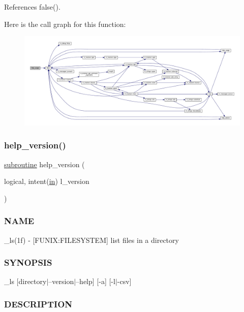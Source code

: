 References false().

Here is the call graph for this function\+:
\nopagebreak
\begin{figure}[H]
\begin{center}
\leavevmode
\includegraphics[width=350pt]{__ls_8f90_a3e09a3b52ee8fb04eeb93fe5761626a8_cgraph}
\end{center}
\end{figure}
\mbox{\label{__ls_8f90_a39c21619b08a3c22f19e2306efd7f766}} 
\subsubsection{\texorpdfstring{help\+\_\+version()}{help\_version()}}
{\footnotesize\ttfamily \hyperlink{M__stopwatch_83_8txt_acfbcff50169d691ff02d4a123ed70482}{subroutine} help\+\_\+version (\begin{DoxyParamCaption}\item[{logical, intent(\hyperlink{M__journal_83_8txt_afce72651d1eed785a2132bee863b2f38}{in})}]{l\+\_\+version }\end{DoxyParamCaption})}



\subsubsection*{N\+A\+ME}

\+\_\+ls(1f) -\/ \mbox{[}F\+U\+N\+IX\+:F\+I\+L\+E\+S\+Y\+S\+T\+EM\mbox{]} list files in a directory \subsubsection*{S\+Y\+N\+O\+P\+S\+IS}

\+\_\+ls \mbox{[}directory$\vert$--version$\vert$--help\mbox{]} \mbox{[}-\/a\mbox{]} \mbox{[}-\/l$\vert$-\/csv\mbox{]} \subsubsection*{D\+E\+S\+C\+R\+I\+P\+T\+I\+ON}

